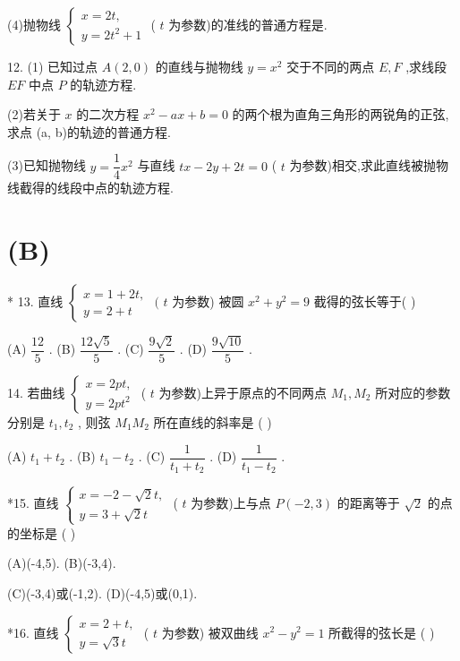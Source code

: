(4)抛物线 $\left\{  \begin{array}{l} x = {2t}, \\  y = 2{t}^{2} + 1 \end{array}\right.$ ( $t$ 为参数)的准线的普通方程是\blkda{}.

12. (1) 已知过点 $A\left( {2,0}\right)$ 的直线与抛物线 $y = {x}^{2}$ 交于不同的两点 $E,F$ ,求线段 ${EF}$ 中点 $P$ 的轨迹方程.

(2)若关于 $x$ 的二次方程 ${x}^{2} - {ax} + b = 0$ 的两个根为直角三角形的两锐角的正弦,求点 (a, b)的轨迹的普通方程.

(3)已知抛物线 $y = \dfrac{1}{4}{x}^{2}$ 与直线 ${tx} - {2y} + {2t} = 0$ ( $t$ 为参数)相交,求此直线被抛物线截得的线段中点的轨迹方程.

\section*{(B)}

* 13. 直线 $\left\{  {\begin{array}{l} x = 1 + {2t}, \\  y = 2 + t \end{array}\text{ ( }t}\right.$ 为参数) 被圆 ${x}^{2} + {y}^{2} = 9$ 截得的弦长等于(   )

(A) $\dfrac{12}{5}$ . (B) $\dfrac{{12}\sqrt{5}}{5}$ . (C) $\dfrac{9\sqrt{2}}{5}$ . (D) $\dfrac{9\sqrt{10}}{5}$ .

14. 若曲线 $\left\{  \begin{array}{l} x = {2pt}, \\  y = {2p}{t}^{2} \end{array}\right.$ ( $t$ 为参数)上异于原点的不同两点 ${M}_{1},{M}_{2}$ 所对应的参数分别是 ${t}_{1},{t}_{2}$ , 则弦 ${M}_{1}{M}_{2}$ 所在直线的斜率是 (   )

(A) ${t}_{1} + {t}_{2}$ . (B) ${t}_{1} - {t}_{2}$ . (C) $\dfrac{1}{{t}_{1} + {t}_{2}}$ . (D) $\dfrac{1}{{t}_{1} - {t}_{2}}$ .

*15. 直线 $\left\{  \begin{array}{l} x =  - 2 - \sqrt{2}t, \\  y = 3 + \sqrt{2}t \end{array}\right.$ ( $t$ 为参数)上与点 $P\left( {-2,3}\right)$ 的距离等于 $\sqrt{2}$ 的点的坐标是 (   )

(A)(-4,5). (B)(-3,4).

(C)(-3,4)或(-1,2). (D)(-4,5)或(0,1).

*16. 直线 $\left\{  \begin{array}{l} x = 2 + t, \\  y = \sqrt{3}t \end{array}\right.$ ( $t$ 为参数) 被双曲线 ${x}^{2} - {y}^{2} = 1$ 所截得的弦长是 ( )

